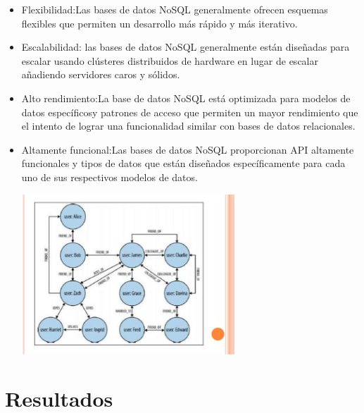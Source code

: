\documentclass[%
 reprint,
 amsmath,amssymb,
 aps,
]{revtex4-1}
\begin{document}
	           \begin{itemize}
		\item Flexibilidad:Las bases de datos NoSQL generalmente ofrecen esquemas flexibles que permiten un desarrollo más rápido y más iterativo. 
                     \item Escalabilidad: las bases de datos NoSQL generalmente están diseñadas para escalar usando clústeres distribuidos de hardware en lugar de escalar añadiendo servidores caros y sólidos. 
		\item Alto rendimiento:La base de datos NoSQL está optimizada para modelos de datos específicosy patrones de acceso que permiten un mayor rendimiento que el intento de lograr una funcionalidad similar con bases de datos relacionales.
		\item Altamente funcional:Las bases de datos NoSQL proporcionan API altamente funcionales y tipos de datos que están diseñados específicamente para cada uno de sus respectivos modelos de datos.
                     \begin{center}
		\includegraphics[width=8cm]{./Imagenes/3}
		\end{center}	
	          \end{itemize}
\section {Resultados}\label{sec:4}
\end{document}
